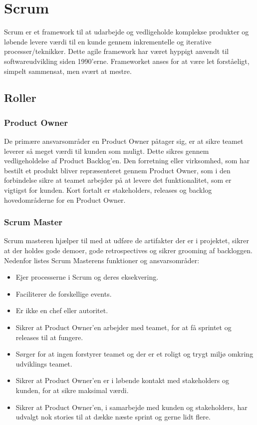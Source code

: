 \section{Scrum}\label{sec:scrum}
Scrum er et framework til at udarbejde og vedligeholde komplekse produkter og løbende levere 
værdi til en kunde gennem inkrementelle og iterative processer/teknikker. 
Dette agile framework har været hyppigt anvendt til softwareudvikling siden 1990’erne. 
Frameworket anses for at være let forståeligt, simpelt sammensat, men svært at mestre.

\subsection{Roller}

\subsubsection{Product Owner}
De primære ansvarsområder en Product Owner påtager sig, er at sikre teamet leverer så 
meget værdi til kunden som muligt. Dette sikres gennem vedligeholdelse af Product Backlog’en. 
Den forretning eller virksomhed, som har bestilt et produkt bliver repræsenteret gennem 
Product Owner, som i den forbindelse sikre at teamet arbejder på at levere det funktionalitet, 
som er vigtigst for kunden. Kort fortalt er stakeholders, releases og backlog hovedområderne for en Product Owner.

\subsubsection{Scrum Master}    
Scrum masteren hjælper til med at udføre de artifakter der er i projektet, sikrer at der holdes gode demoer, 
gode retrospectives og sikrer grooming af backloggen.\\

Nedenfor listes Scrum Masterens funktioner og ansvarsområder:

\begin{itemize}
    \item Ejer processerne i Scrum og deres eksekvering.
    \item Faciliterer de forskellige events.
    \item Er ikke en chef eller autoritet.
    \item Sikrer at Product Owner’en arbejder med teamet, for at få sprintet og releases til at fungere.
    \item Sørger for at ingen forstyrer teamet og der er et roligt og trygt miljø omkring udviklings teamet.
    \item Sikrer at Product Owner’en er i løbende kontakt med stakeholders og kunden, for at sikre maksimal værdi.
    \item Sikrer at Product Owner’en, i samarbejde med kunden og stakeholders, har udvalgt nok stories til at dække næste sprint og gerne lidt flere.
\end{itemize}


